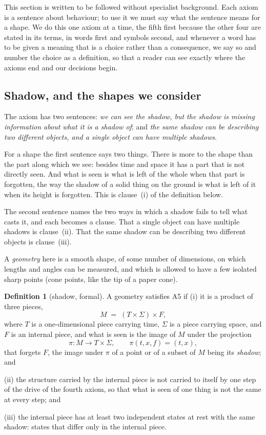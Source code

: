 \documentclass[11pt,a4paper]{article}
\theoremstyle{plain}
\theoremstyle{definition}
\newtheorem{definition}[theorem]{Definition}
\theoremstyle{remark}
\begin{document}
This section is written to be followed without specialist background. Each axiom is a sentence about behaviour; to use it we must say what the sentence means for a shape. We do this one axiom at a time, the fifth first because the other four are stated in its terms, in words first and symbols second, and whenever a word has to be given a meaning that is a choice rather than a consequence, we say so and number the choice as a definition, so that a reader can see exactly where the axioms end and our decisions begin.

\subsection{Shadow, and the shapes we consider}\label{sec:A5}

The axiom has two sentences: \emph{we can see the shadow, but the shadow is missing information about what it is a shadow of}; and \emph{the same shadow can be describing two different objects, and a single object can have multiple shadows}.

For a shape the first sentence says two things. There is more to the shape than the part along which we see: besides time and space it has a part that is not directly seen. And what is seen is what is left of the whole when that part is forgotten, the way the shadow of a solid thing on the ground is what is left of it when its height is forgotten. This is clause~(i) of the definition below.

The second sentence names the two ways in which a shadow fails to tell what casts it, and each becomes a clause. That a single object can have multiple shadows is clause~(ii). That the same shadow can be describing two different objects is clause~(iii).

A \emph{geometry} here is a smooth shape, of some number of dimensions, on which lengths and angles can be measured, and which is allowed to have a few isolated sharp points (cone points, like the tip of a paper cone).

\begin{definition}[shadow, formal]\label{def:A5}
A geometry satisfies A5 if (i) it is a product of three pieces,
\begin{equation}\label{eq:family}
M \;=\; (T \times \Sigma) \times F ,
\end{equation}
where $T$ is a one-dimensional piece carrying time, $\Sigma$ is a piece carrying space, and $F$ is an internal piece, and what is seen is the image of $M$ under the projection
\[
\pi\colon M\to T\times\Sigma,\qquad \pi(t,x,f)=(t,x),
\]
that forgets $F$, the image under $\pi$ of a point or of a subset of $M$ being its \emph{shadow}; and

(ii) the structure carried by the internal piece is not carried to itself by one step of the drive of the fourth axiom, so that what is seen of one thing is not the same at every step; and

(iii) the internal piece has at least two independent states at rest with the same shadow: states that differ only in the internal piece.
\end{definition}
\end{document}
